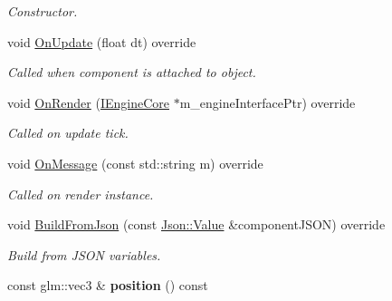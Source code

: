 \begin{DoxyCompactItemize}
\begin{DoxyCompactList}\small\item\em Constructor. \end{DoxyCompactList}\item 
\hypertarget{class_transform_component_ab763f5af77fcb5eee0e725c219901fa3}{void \hyperlink{class_transform_component_ab763f5af77fcb5eee0e725c219901fa3}{On\+Update} (float dt) override}\label{class_transform_component_ab763f5af77fcb5eee0e725c219901fa3}

\begin{DoxyCompactList}\small\item\em Called when component is attached to object. \end{DoxyCompactList}\item 
\hypertarget{class_transform_component_aaadf29ab1be89d21ac13b3e7e5030be8}{void \hyperlink{class_transform_component_aaadf29ab1be89d21ac13b3e7e5030be8}{On\+Render} (\hyperlink{class_i_engine_core}{I\+Engine\+Core} $\ast$m\+\_\+engine\+Interface\+Ptr) override}\label{class_transform_component_aaadf29ab1be89d21ac13b3e7e5030be8}

\begin{DoxyCompactList}\small\item\em Called on update tick. \end{DoxyCompactList}\item 
void \hyperlink{class_transform_component_ac250c4b7e47e639d0f8693d04c9b5051}{On\+Message} (const std\+::string m) override
\begin{DoxyCompactList}\small\item\em Called on render instance. \end{DoxyCompactList}\item 
\hypertarget{class_transform_component_a4b1799af3b52257841775966452f231b}{void \hyperlink{class_transform_component_a4b1799af3b52257841775966452f231b}{Build\+From\+Json} (const \hyperlink{class_json_1_1_value}{Json\+::\+Value} \&component\+J\+S\+O\+N) override}\label{class_transform_component_a4b1799af3b52257841775966452f231b}

\begin{DoxyCompactList}\small\item\em Build from J\+S\+O\+N variables. \end{DoxyCompactList}\item 
\hypertarget{class_transform_component_a720f52d1a6425e336304ea15b2e45e21}{const glm\+::vec3 \& {\bfseries position} () const }\label{class_transform_component_a720f52d1a6425e336304ea15b2e45e21}


\end{DoxyCompactItemize}
